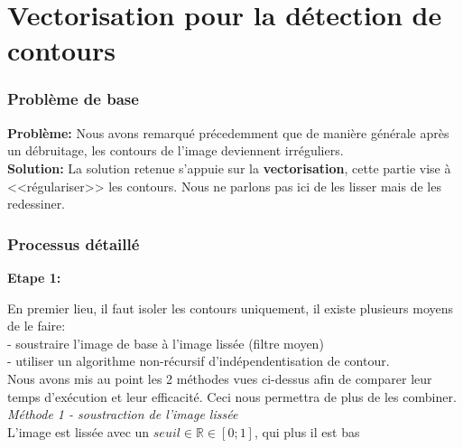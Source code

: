 \documentclass{article}
\newcommand{\R}{\mathbb{R}} %
\begin{document}
	\newpage


	\part*{Vectorisation pour la détection de contours}
	
	
		\section{Problème de base}
			\textbf{Problème: }Nous avons remarqué précedemment que de manière générale après un débruitage, les contours de l'image deviennent irréguliers.\\
			\textbf{Solution: }La solution retenue s'appuie sur la \textbf{vectorisation}, cette partie vise à <<régulariser>> les contours. Nous ne parlons pas ici de les lisser mais de les redessiner.\\
		
		
		\section{Processus détaillé}
			\textbf{Etape 1: }\par
			En premier lieu, il faut isoler les contours uniquement, il existe plusieurs moyens de le faire:\\
			- soustraire l'image de base à l'image lissée (filtre moyen)\\
			- utiliser un algorithme non-récursif d'indépendentisation de contour.\\
			Nous avons mis au point les 2 méthodes vues ci-dessus afin de comparer leur temps d'exécution et leur efficacité. Ceci nous permettra de plus de les combiner.\\
			
			\indent	\emph{Méthode 1 - soustraction de l'image lissée}\\
			L'image est lissée avec un \begin{math}seuil \in \R \in [0;1]\end{math}, qui plus il est bas
	
	\newpage
	
	
	
\end{document}

